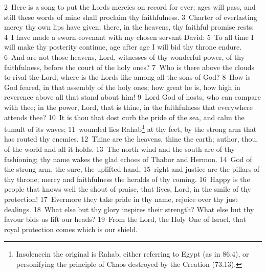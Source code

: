 \documentclass[10pt]{book} %
\begin{document}
\textcolor{benred8}{2}~Here is a song to put the Lord\textquotesingle s mercies on record for ever; ages will pass, and still these words of mine shall proclaim thy faithfulness. \textcolor{benred8}{3}~Charter of everlasting mercy thy own lips have given; there, in the heavens, thy faithful promise rests: \textcolor{benred8}{4}~I have made a sworn covenant with my chosen servant David: \textcolor{benred8}{5}~To all time I will make thy posterity continue, age after age I will bid thy throne endure.
\textcolor{benred8}{6}~And are not those heavens, Lord, witnesses of thy wonderful power, of thy faithfulness, before the court of the holy ones? \textcolor{benred8}{7}~Who is there above the clouds to rival the Lord; where is the Lord\textquotesingle s like among all the sons of God? \textcolor{benred8}{8}~How is God feared, in that assembly of the holy ones; how great he is, how high in reverence above all that stand about him! \textcolor{benred8}{9}~Lord God of hosts, who can compare with thee; in the power, Lord, that is thine, in the faithfulness that everywhere attends thee? \textcolor{benred8}{10}~It is thou that dost curb the pride of the sea, and calm the tumult of its waves; \textcolor{benred8}{11}~wounded lies Rahab\footnote[1]{\textasciigrave Insolence\textquotesingle  in the original is \textasciigrave Rahab\textquotesingle , either referring to Egypt (as in 86.4), or personifying the principle of Chaos destroyed by the Creation (73.13).} at thy feet, by the strong arm that has routed thy enemies. \textcolor{benred8}{12}~Thine are the heavens, thine the earth; author, thou, of the world and all it holds. \textcolor{benred8}{13}~The north wind and the south are of thy fashioning; thy name wakes the glad echoes of Thabor and Hermon. \textcolor{benred8}{14}~God of the strong arm, the sure, the uplifted hand, \textcolor{benred8}{15}~right and justice are the pillars of thy throne; mercy and faithfulness the heralds of thy coming.
\textcolor{benred8}{16}~Happy is the people that knows well the shout of praise, that lives, Lord, in the smile of thy protection! \textcolor{benred8}{17}~Evermore they take pride in thy name, rejoice over thy just dealings. \textcolor{benred8}{18}~What else but thy glory inspires their strength? What else but thy favour bids us lift our heads? \textcolor{benred8}{19}~From the Lord, the Holy One of Israel, that royal protection comes which is our shield.
\end{document}
